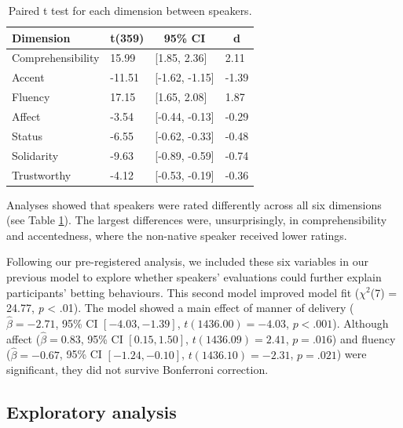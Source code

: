 \documentclass[
  man,floatsintext]{apa7}
\begin{document}
\begin{table}[tbp]

\begin{center}
\begin{threeparttable}

\caption{\label{tab:tab6}Paired t test for each dimension between speakers.}

\begin{tabular}{llll}
\toprule
Dimension & \multicolumn{1}{c}{t(359)} & \multicolumn{1}{c}{95\% CI} & \multicolumn{1}{c}{d}\\
\midrule
Comprehensibility & 15.99 & {}[1.85, 2.36] & 2.11\\
Accent & -11.51 & {}[-1.62, -1.15] & -1.39\\
Fluency & 17.15 & {}[1.65, 2.08] & 1.87\\
Affect & -3.54 & {}[-0.44, -0.13] & -0.29\\
Status & -6.55 & {}[-0.62, -0.33] & -0.48\\
Solidarity & -9.63 & {}[-0.89, -0.59] & -0.74\\
Trustworthy & -4.12 & {}[-0.53, -0.19] & -0.36\\
\bottomrule
\end{tabular}

\end{threeparttable}
\end{center}

\end{table}

Analyses showed that speakers were rated differently across all six dimensions (see Table \ref{tab:tab6}). The largest differences were, unsurprisingly, in comprehensibility and accentedness, where the non-native speaker received lower ratings.

Following our pre-registered analysis, we included these six variables in our previous model to explore whether speakers' evaluations could further explain participants' betting behaviours. This second model improved model fit (\(\chi^2\)(7) = 24.77, \emph{p} \textless{} .01). The model showed a main effect of manner of delivery (\(\hat{\beta} = -2.71\), 95\% CI \([-4.03, -1.39]\), \(t(1436.00) = -4.03\), \(p < .001\)). Although affect (\(\hat{\beta} = 0.83\), 95\% CI \([0.15, 1.50]\), \(t(1436.09) = 2.41\), \(p = .016\)) and fluency (\(\hat{\beta} = -0.67\), 95\% CI \([-1.24, -0.10]\), \(t(1436.10) = -2.31\), \(p = .021\)) were significant, they did not survive Bonferroni correction.

\hypertarget{exploratory-analysis}{%
\subsection{Exploratory analysis}\label{exploratory-analysis}}
\end{document}
